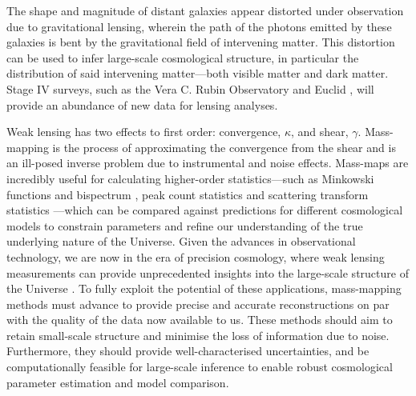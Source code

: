 \documentclass[fleqn,usenatbib]{mnras}
\begin{document}
The shape and magnitude of distant galaxies appear distorted under observation due to gravitational lensing, wherein the path of the photons emitted by these galaxies is bent by the gravitational field of intervening matter.
This distortion can be used to infer large-scale cosmological structure, in particular the distribution of said intervening matter---both visible matter and dark matter. Stage IV surveys, such as the Vera C. Rubin Observatory \citep{ivezic2019lsst} and Euclid \citep{laureijs2011euclid}, will provide
an abundance of new data for lensing analyses.

Weak lensing has two effects to first order: convergence, $\kappa$, and shear, $\gamma$. Mass-mapping is the process of approximating the convergence from the shear and is an ill-posed inverse problem due to instrumental and noise effects. Mass-maps are incredibly useful for calculating higher-order statistics---such as Minkowski functions and bispectrum \citep{munshi2017integrated}, peak count statistics \citep{liu2015cosmology,liu2015cosmological,martinet2018kids,harnois2021cosmic} and scattering transform statistics \citep{cheng2020new}---which can be compared against predictions for different cosmological models to constrain parameters and refine our understanding of the true underlying nature of the Universe. Given the advances in observational technology, we are now in the era of precision cosmology, where weak lensing measurements can provide unprecedented insights into the large-scale structure of the Universe \citep{mandelbaum2018weak}. To fully exploit the potential of these applications, mass-mapping methods must advance to provide precise and accurate reconstructions on par with the quality of the data now available to us. These methods should aim to retain small-scale structure and minimise the loss of information due to noise. Furthermore, they should provide well-characterised uncertainties, and be computationally feasible for large-scale inference to enable robust cosmological parameter estimation and model comparison.
\end{document}
